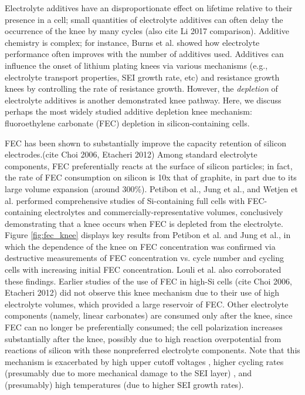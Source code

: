\documentclass[journal=jpcl, manuscript=article, layout=onecolumn]{achemso}
\begin{document}
Electrolyte additives have an disproportionate effect on lifetime relative to their presence in a cell; small quantities of electrolyte additives can often delay the occurrence of the knee by many cycles\cite{ma_editors_2019} (also cite Li 2017 comparison). Additive chemistry is complex; for instance, Burns et al.\cite{burns_predicting_2013} showed how electrolyte performance often improves with the number of additives used. Additives can influence the onset of lithium plating knees via various mechanisms (e.g., electrolyte transport properties, SEI growth rate, etc) and resistance growth knees by controlling the rate of resistance growth\cite{ma_editors_2019}. However, the \textit{depletion} of electrolyte additives is another demonstrated knee pathway. Here, we discuss perhaps the most widely studied additive depletion knee mechanism: fluoroethylene carbonate (FEC) depletion in silicon-containing cells.

FEC has been shown to substantially improve the capacity retention of silicon electrodes.(cite Choi 2006, Etacheri 2012)
Among standard electrolyte components, FEC preferentially reacts at the surface of silicon particles; in fact, the rate of FEC consumption on silicon is 10x that of graphite, in part due to its large volume expansion (around 300\%).\cite{wetjen_differentiating_2017}
Petibon et al.\cite{petibon_studies_2016},
Jung et al.\cite{jung_consumption_2016},
and Wetjen et al.\cite{wetjen_differentiating_2017}
performed comprehensive studies of Si-containing full cells with FEC-containing electrolytes and commercially-representative volumes,
conclusively demonstrating that a knee occurs when FEC is depleted from the electrolyte.
Figure \ref{fig:fec_knee} displays key results from Petibon et al.\cite{petibon_studies_2016} and
Jung et al.\cite{jung_consumption_2016}, in which the dependence of the knee on FEC concentration was confirmed via destructive measurements of FEC concentration vs. cycle number\cite{petibon_studies_2016} and cycling cells with increasing initial FEC concentration\cite{jung_consumption_2016}.
Louli et al.\cite{louli_operando_2019} also corroborated these findings.
Earlier studies of the use of FEC in high-Si cells (cite Choi 2006, Etacheri 2012) did not observe this knee mechanism due to their use of high electrolyte volumes, which provided a large reservoir of FEC.
Other electrolyte components (namely, linear carbonates) are consumed only after the knee, since FEC can no longer be preferentially consumed\cite{petibon_studies_2016}; the cell polarization increases substantially after the knee\cite{petibon_studies_2016, jung_consumption_2016, wetjen_differentiating_2017}, possibly due to high reaction overpotential from reactions of silicon with these nonpreferred electrolyte components.
Note that this mechanism is exacerbated by high upper cutoff voltages \cite{petibon_studies_2016}, higher cycling rates (presumably due to more mechanical damage to the SEI layer) \cite{petibon_studies_2016}, and (presumably) high temperatures (due to higher SEI growth rates).
\end{document}
